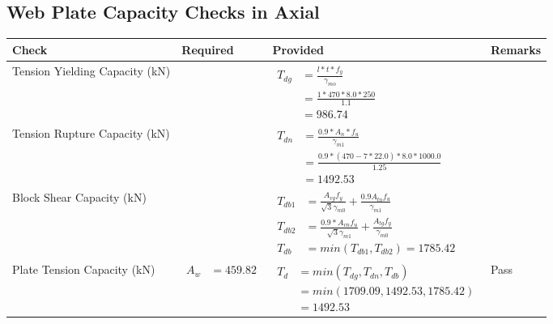 \documentclass{article}%
\begin{document}
\subsection{Web Plate Capacity Checks in Axial}%
\label{subsec:WebPlateCapacityChecksinAxial}%
\renewcommand{\arraystretch}{1.2}%
\begin{longtable}{|p{4cm}|p{6cm}|p{5.5cm}|p{1.5cm}|}%
\hline%
\rowcolor{OsdagGreen}%
Check&Required&Provided&Remarks\\%
\hline%
\endhead%
\hline%
Tension Yielding Capacity (kN)&&$\begin{aligned} T_{dg} &= \frac{l*t*f_y}{\gamma_{mo}}\\ &=\frac{1*470*8.0*250}{1.1}\\ &=986.74\end{aligned}$&\\%
\hline%
Tension Rupture Capacity (kN)&&$\begin{aligned} T_{dn} &= \frac{0.9*A_{n}*f_u}{\gamma_{m1}}\\ &=\frac{0.9*(470-7*22.0)*8.0*1000.0}{1.25}\\ &=1492.53\end{aligned}$&\\%
\hline%
Block Shear Capacity (kN)&&$\begin{aligned}T_{db1} &= \frac{A_{vg} f_{y}}{\sqrt{3} \gamma_{m0}} + \frac{0.9 A_{tn} f_{u}}{\gamma_{m1}}\\ T_{db2} &= \frac{0.9*A_{vn} f_{u}}{\sqrt{3} \gamma_{m1}} + \frac{A_{tg} f_{y}}{\gamma_{m0}}\\ T_{db} &= min(T_{db1}, T_{db2})= 1785.42\end{aligned}$&\\%
\hline%
Plate Tension Capacity (kN)&$\begin{aligned} A_w &=459.82\end{aligned}$&$\begin{aligned} T_d &= min(T_{dg},T_{dn},T_{db})\\ &= min(1709.09,1492.53,1785.42)\\ &=1492.53\end{aligned}$&Pass\\%
\hline%
\end{longtable}

%
\newpage%
\end{document}
